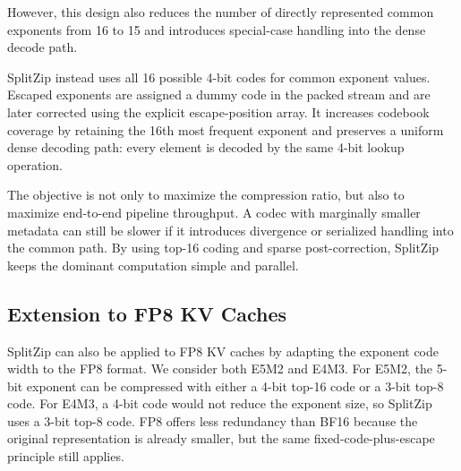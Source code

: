 However, this design also reduces the number of directly represented common exponents from 16 to 15 and introduces special-case handling into the dense decode path.

SplitZip instead uses all 16 possible 4-bit codes for common exponent values. 
Escaped exponents are assigned a dummy code in the packed stream and are later corrected using the explicit escape-position array. 
It increases codebook coverage by retaining the 16th most frequent exponent and preserves a uniform dense decoding path: every element is decoded by the same 4-bit lookup operation.

The objective is not only to maximize the compression ratio, but also to maximize end-to-end pipeline throughput. 
A codec with marginally smaller metadata can still be slower if it introduces divergence or serialized handling into the common path. 
By using top-16 coding and sparse post-correction, SplitZip keeps the dominant computation simple and parallel.

\subsection{Extension to FP8 KV Caches}
\label{sec:method_fp8}

SplitZip can also be applied to FP8 KV caches by adapting the exponent code width to the FP8 format. 
We consider both E5M2 and E4M3. 
For E5M2, the 5-bit exponent can be compressed with either a 4-bit top-16 code or a 3-bit top-8 code. For E4M3, a 4-bit code would not reduce the exponent size, so SplitZip uses a 3-bit top-8 code.
FP8 offers less redundancy than BF16 because the original representation is already smaller, but the same fixed-code-plus-escape principle still applies.

